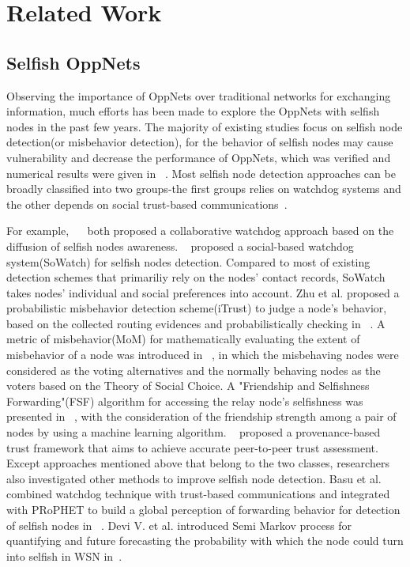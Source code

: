 \section{Related Work}
\label{sec:related}
\subsection{Selfish OppNets}
Observing the importance of OppNets over traditional networks for exchanging information, much efforts has been made to explore the OppNets with selfish nodes in the past few years.
The majority of existing studies focus on selfish node detection(or misbehavior detection), for the behavior of selfish nodes may cause vulnerability and decrease the performance of OppNets, which was verified and numerical results were given in ~\cite{DBLP:journals/icl/Karaliopoulos09}.
Most selfish node detection approaches can be broadly classified into two groups-the first groups relies on watchdog systems and the other depends on social trust-based communications~\cite{DBLP:journals/comsur/JedariXN18}.

For example, ~\cite{DBLP:conf/mswim/Hernandez-OralloOCCM12}~\cite{DBLP:journals/tmc/Hernandez-Orallo15} both proposed a collaborative watchdog approach based on the diffusion of selfish nodes awareness.
~\cite{DBLP:journals/fgcs/JedariXCDTA19} proposed a social-based watchdog system(SoWatch) for selfish nodes detection. Compared to most of existing detection schemes that primariliy rely on the nodes' contact records, SoWatch takes nodes' individual and social preferences into account.
Zhu et al. proposed a probabilistic misbehavior detection scheme(iTrust) to judge a node's behavior, based on the collected routing evidences and probabilistically checking in ~\cite{DBLP:journals/tpds/ZhuDGDC14}.
A metric of misbehavior(MoM) for mathematically evaluating the extent of misbehavior of a node was introduced in ~\cite{DBLP:conf/icc/ChatterjeeSM15}, in which the misbehaving nodes were considered as the voting alternatives and the normally behaving nodes as the voters based on the Theory of Social Choice.
A "Friendship and Selfishness Forwarding"(FSF) algorithm for accessing the relay node's selfishness was presented in ~\cite{DBLP:journals/corr/SouzaMGSMCC17}, with the consideration of the friendship strength among a pair of nodes by using a machine learning algorithm.
~\cite{DBLP:journals/tdsc/ChoC18} proposed a provenance-based trust framework that aims to achieve accurate peer-to-peer trust assessment.
Except approaches mentioned above that belong to the two classes, researchers also investigated other methods to improve selfish node detection.
Basu et al. combined watchdog technique with trust-based communications and integrated with PRoPHET to build a global perception of forwarding behavior for detection of selfish nodes in ~\cite{DBLP:journals/jnca/BasuBRB18}.
Devi V. et al. introduced Semi Markov process for quantifying and future forecasting the probability with which the node could turn into selfish in WSN in~\cite{DBLP:journals/cybersec/VR19}.

